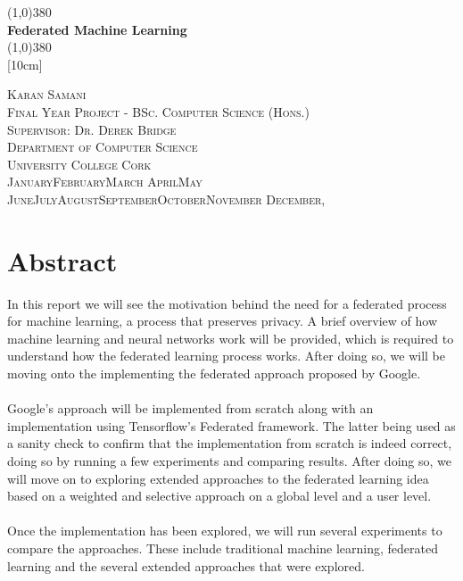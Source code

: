 \documentclass[12pt]{article}
\newcommand{\dateasreq}{\ifcase \month \or January\or February\or March\or %
April\or May \or June\or July\or August\or September\or October\or November\or %
December\fi, \number \year}
\begin{document}
\makeatletter

\begin{titlepage}
	\begin{center}
		\line(1,0){380}\\				
		[0.32cm]
		\huge{\bfseries Federated Machine Learning}\\
		[0.16cm]		
		\line(1,0){380}\\
		[10cm]
	\end{center}
	\begin{center}	
		\textsc{\large Karan Samani}\\
		\textsc{\large Final Year Project - BSc. Computer Science (Hons.)}\\
		\textsc{\large Supervisor: Dr. Derek Bridge}\\
		\textsc{\large Department of Computer Science}\\
		\textsc{\large University College Cork}\\
		\textsc{\large \dateasreq}
	\end{center}
\end{titlepage}
\cleardoublepage

\section*{Abstract}
In this report we will see the motivation behind the need for a federated process for machine learning, a process that preserves privacy. A brief overview of how machine learning and neural networks work will be provided, which is required to understand how the federated learning process works. After doing so, we will be moving onto the implementing the federated approach proposed by Google.
\\\\
Google's approach will be implemented from scratch along with an implementation using Tensorflow's Federated framework. The latter being used as a sanity check to confirm that the implementation from scratch is indeed correct, doing so by running a few experiments and comparing results. After doing so, we will move on to exploring extended approaches to the federated learning idea based on a weighted and selective approach on a global level and a user level.
\\\\ 
Once the implementation has been explored, we will run several experiments to compare the approaches. These include traditional machine learning, federated learning and the several extended approaches that were explored.
\clearpage
\end{document}
